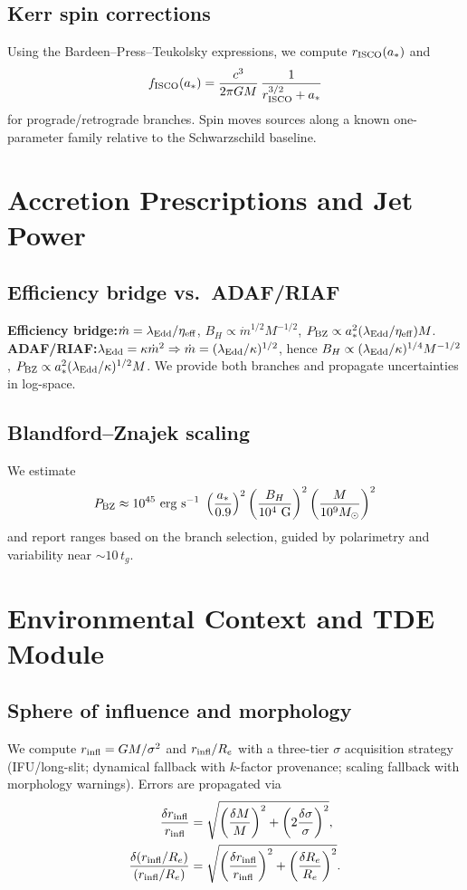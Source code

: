 \documentclass[11pt]{article}
\begin{document}
\subsection{Kerr spin corrections}
Using the Bardeen--Press--Teukolsky expressions, we compute $r_{\rm ISCO}(a_*)$ and
\begin{equation}
  f_{\rm ISCO}(a_*)=\frac{c^3}{2\pi GM}\,\frac{1}{r_{\rm ISCO}^{3/2}+a_*}
\end{equation}
for prograde/retrograde branches. Spin moves sources along a known one-parameter family relative to the Schwarzschild baseline.

\section{Accretion Prescriptions and Jet Power}
\subsection{Efficiency bridge vs.\ ADAF/RIAF}
\textbf{Efficiency bridge:}\quad $\dot{m}=\lambda_{\rm Edd}/\eta_{\rm eff}$, $B_H\propto \dot{m}^{1/2}M^{-1/2}$, $P_{\rm BZ}\propto a_*^2(\lambda_{\rm Edd}/\eta_{\rm eff})M$.\\[3pt]
\textbf{ADAF/RIAF:}\quad $\lambda_{\rm Edd}=\kappa\dot{m}^2 \Rightarrow \dot{m}=(\lambda_{\rm Edd}/\kappa)^{1/2}$, hence $B_H\propto(\lambda_{\rm Edd}/\kappa)^{1/4}M^{-1/2}$, $P_{\rm BZ}\propto a_*^2(\lambda_{\rm Edd}/\kappa)^{1/2}M$. We provide both branches and propagate uncertainties in log-space.
\subsection{Blandford--Znajek scaling}
We estimate
\begin{equation}
  P_{\rm BZ}\approx 10^{45}\ \mathrm{erg\ s^{-1}}\ \left(\frac{a_*}{0.9}\right)^2\left(\frac{B_H}{10^4\ \mathrm{G}}\right)^2\left(\frac{M}{10^9M_\odot}\right)^2
\end{equation}
and report ranges based on the branch selection, guided by polarimetry and variability near $\sim 10\,t_g$.

\section{Environmental Context and TDE Module}
\subsection{Sphere of influence and morphology}
We compute $r_{\rm infl}=GM/\sigma^2$ and $r_{\rm infl}/R_e$ with a three-tier $\sigma$ acquisition strategy (IFU/long-slit; dynamical fallback with $k$-factor provenance; scaling fallback with morphology warnings). Errors are propagated via
\begin{align}
\frac{\delta r_{\rm infl}}{r_{\rm infl}}&=\sqrt{\left(\frac{\delta M}{M}\right)^2+\left(2\frac{\delta\sigma}{\sigma}\right)^2},\\
\frac{\delta (r_{\rm infl}/R_e)}{(r_{\rm infl}/R_e)}&=\sqrt{\left(\frac{\delta r_{\rm infl}}{r_{\rm infl}}\right)^2+\left(\frac{\delta R_e}{R_e}\right)^2}.
\end{align}
\end{document}
